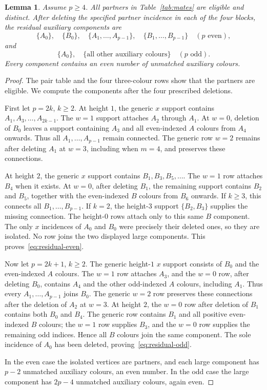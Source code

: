 \documentclass[11pt,reqno]{amsart}
\numberwithin{equation}{section}
\newtheorem{lemma}[theorem]{Lemma}
\theoremstyle{definition}
\theoremstyle{remark}
\begin{document}
\begin{lemma}\label{lem:entry-components}
Assume $p\ge4$. All partners in Table~\ref{tab:mates} are eligible and distinct. After deleting the
specified partner incidence in each of the four blocks, the residual auxiliary
components are
\begin{equation}\label{eq:residual-even}
 \{A_0\},\quad\{B_0\},\quad
 \{A_1,\ldots,A_{p-1}\},\quad\{B_1,\ldots,B_{p-1}\}
 \quad(p\text{ even}),
\end{equation}
and
\begin{equation}\label{eq:residual-odd}
 \{A_0\},\quad\{\text{all other auxiliary colours}\}
 \quad(p\text{ odd}).
\end{equation}
Every component contains an even number of unmatched auxiliary colours.
\end{lemma}
\begin{proof}
The pair table and the four three-colour rows show that the partners are
eligible. We compute the components after the four prescribed deletions.

First let $p=2k$, $k\ge2$. At height $1$, the generic $x$ support contains
$A_1,A_3,\ldots,A_{2k-1}$. The $w=1$ support attaches $A_2$ through $A_1$.
At $w=0$, deletion of $B_0$ leaves a support containing $A_3$ and all even-indexed
$A$ colours from $A_4$ onwards. Thus all $A_1,\ldots,A_{p-1}$ remain connected.
The generic row $w=2$ remains after deleting $A_1$ at $w=3$, including when
$m=4$, and preserves these connections.

At height $2$, the generic $x$ support contains $B_1,B_3,B_5,\ldots$.
The $w=1$ row attaches $B_4$ when it exists. At $w=0$, after deleting $B_1$, the
remaining support contains $B_2$ and $B_5$, together with the even-indexed $B$
colours from $B_6$ onwards. If $k\ge3$, this connects all $B_1,\ldots,B_{p-1}$.
If $k=2$, the height-$3$ support $\{B_2,B_3\}$ supplies the missing connection.
The height-$0$ rows attach only to this same $B$ component. The only $x$
incidences of $A_0$ and $B_0$ were precisely their deleted ones, so they are
isolated. No row joins the two displayed large components. This
proves~\eqref{eq:residual-even}.

Now let $p=2k+1$, $k\ge2$. The generic height-$1$ $x$ support consists of $B_0$
and the even-indexed $A$ colours. The $w=1$ row attaches $A_3$, and the $w=0$
row, after deleting $B_0$, contains $A_4$ and the other odd-indexed $A$ colours,
including $A_1$. Thus every $A_1,\ldots,A_{p-1}$ joins $B_0$.
The generic $w=2$ row preserves these connections after the deletion of
$A_2$ at $w=3$.
At height $2$, the $w=0$ row after deletion of $B_1$ contains both $B_0$ and
$B_4$. The generic row contains $B_1$ and all positive even-indexed $B$ colours;
the $w=1$ row supplies $B_3$, and the $w=0$ row supplies the remaining odd
indices. Hence all $B$ colours join the same component. The sole incidence of
$A_0$ has been deleted, proving~\eqref{eq:residual-odd}.

In the even case the isolated vertices are partners, and each large component has
$p-2$ unmatched auxiliary colours, an even number. In the odd case the large component has $2p-4$
unmatched auxiliary colours, again even.
\end{proof}
\end{document}
